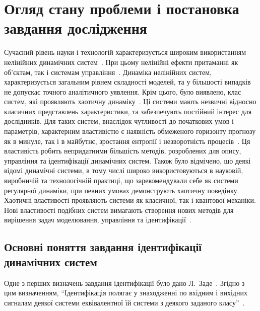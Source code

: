 \chapter{Огляд стану проблеми і постановка завдання дослідження}

Сучасний рівень науки і технологій характеризується широким
використанням нелінійних динамічних систем~\cite{andronov_vitt_haikin,
anisch_nonlin_eff, mishenko_du_small_relax, nonlin_vibro, malinetskii_modern_methods_nl_dyn}. При цьому
нелінійні ефекти притаманні як об'єктам, так і системам
управління~\cite{kubik_nlsc, vukobr_nonadopt}. Динаміка нелінійних систем,
характеризується загальним рівнем складності моделей,
та у більшості випадків не допускає точного аналітичного
уявлення.
Крім цього, було виявлено,
клас систем, які проявляють
хаотичну динаміку~\cite{moon_chaotic_vibr, magni_theory_dyn_chaos, kuznetsov_dyn_chaos,
neimark_stoch_chaos_vibro, anisch_reg_and_chaotic_vibro}.
Ці системи мають незвичні відносно класичних представлень характеристики, та
забезпечують
постійний інтерес для дослідників.
Для таких систем, внаслідок
чутливості до початкових умов і параметрів, характерним
властивістю є наявність обмеженого горизонту прогнозу як в
минуле, так і в майбутнє, зростання ентропії і незворотність
процесів~\cite{chernavskii_syn_info,prigogine_from_existent,koltsova_nl_dyn_chem}. Ця
властивість робить непридатними більшість методів, розроблених
для опису, управління та ідентифікації динамічних систем. Також
було відмічено, що деякі відомі динамічні системи, в тому числі
широко використовуються в науковій, виробничій та технологічній
практиці, що зарекомендували себе як системи регулярної динаміки,
при певних умовах демонструють хаотичну поведінку. Хаотичні
властивості проявляють системи як класичної, так і квантової
механіки. Нові властивості подібних систем вимагають створення
нових методів для вирішення задач моделювання, управління та
ідентифікації~\cite{karabutov_adapt_id_sys,dmitriev_trans_chaos_lowpower}.


\section{Основні поняття завдання ідентифікації динамічних систем} %

Одне з перших визначень завдання ідентифікації було дано
Л.~Заде~\cite{zadeh_id_1956}. Згідно з цим визначенням,
``Ідентифікація полягає у знаходженні по вхідним і вихідних сигналам деякої
системи еквівалентної їй системи з деякого заданого
класу''~\cite{eykhoff_id_base, eykhoff_modern_id, lung_id_sys}.


